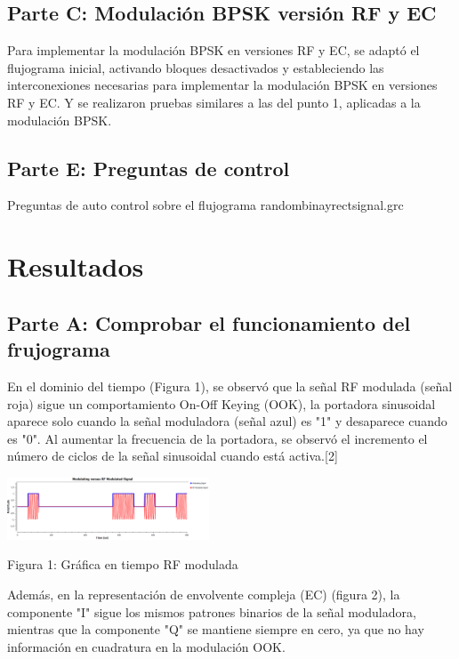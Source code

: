 \documentclass{journal}[IEEEtran, twocolumn]             %
\begin{document}
\begin{multicols}{2}
\subsection{Parte C: Modulación BPSK versión RF y EC}

Para implementar la modulación BPSK en versiones RF y EC, se adaptó el flujograma inicial, activando bloques desactivados y estableciendo las interconexiones necesarias para implementar la modulación BPSK en versiones RF y EC. Y se realizaron pruebas similares a las del punto 1, aplicadas a la modulación BPSK.



\subsection{Parte E: Preguntas de control}
Preguntas de auto control sobre el flujograma randombinayrectsignal.grc
    
\section{Resultados}
\subsection{Parte A: Comprobar el funcionamiento del frujograma}


En el dominio del tiempo (Figura 1), se observó que la señal RF modulada (señal roja) sigue un comportamiento On-Off Keying (OOK), la portadora sinusoidal aparece solo cuando la señal moduladora (señal azul) es "1" y desaparece cuando es "0". Al aumentar la frecuencia de la portadora, se observó el incremento el número de ciclos de la señal sinusoidal cuando está activa.[2]

    \begin{center}
    \includegraphics[width=0.45\textwidth]{figs/F1.png}
    \caption{Figura 1: Gráfica en tiempo RF modulada}
    \label{fig:1}
    \end{center}

Además, en la representación de envolvente compleja (EC) (figura 2), la componente "I" sigue los mismos patrones binarios de la señal moduladora, mientras que la componente "Q" se mantiene siempre en cero, ya que no hay información en cuadratura en la modulación OOK. 


\end{multicols}
\end{document}
